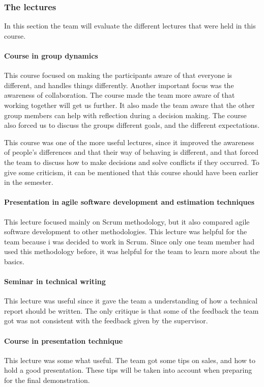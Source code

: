\subsubsection{The lectures}
In this section the team will evaluate the different lectures that were held in this course.

\paragraph{Course in group dynamics}
This course focused on making the participants aware of that everyone is different, and handles things differently. Another important focus was the awareness of collaboration. The course made the team more aware of that working together will get us further. It also made the team aware that the other group members can help with reflection during a decision making. The course also forced us to discuss the groups different goals, and the different expectations. 

This course was one of the more useful lectures, since it improved the awareness of people's differences
and that their way of behaving is different, and that forced the team to discuss how to make decisions and solve conflicts if they occurred. To give some criticism, it can be mentioned that this course should have been earlier in the semester.

\paragraph{Presentation in agile software development and estimation techniques}
This lecture focused mainly on Scrum methodology, but it also compared agile software development to other methodologies. This lecture was helpful for the team because i was decided to work in Scrum. Since only one team member had used this methodology before, it was helpful for the team to learn more about the basics. 

\paragraph{Seminar in technical writing}
This lecture was useful since it gave the team a understanding of how a technical report should be written. The only critique is that some of the feedback the team got was not consistent with the feedback given by the supervisor.

\paragraph{Course in presentation technique}
This lecture was some what useful. The team got some tips on sales, and how to hold a good presentation. These tips will be taken into account when preparing for the final demonstration. 

